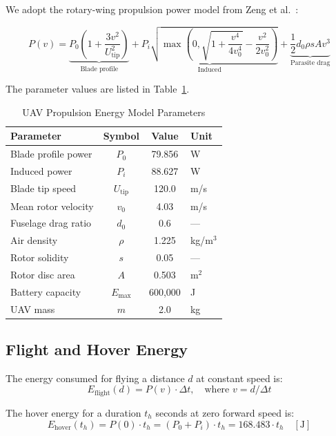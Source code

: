 \documentclass[12pt, a4paper, oneside]{report}
\begin{document}
We adopt the rotary-wing propulsion power model from Zeng et al.~\cite{zeng2019energy}:

\begin{equation}
P(v) = \underbrace{P_0\left(1 + \frac{3v^2}{U_{\text{tip}}^2}\right)}_{\text{Blade profile}} + \underbrace{P_i\sqrt{\max\left(0, \sqrt{1 + \frac{v^4}{4v_0^4}} - \frac{v^2}{2v_0^2}\right)}}_{\text{Induced}} + \underbrace{\frac{1}{2}d_0 \rho s A v^3}_{\text{Parasite drag}}
\label{eq:propulsion}
\end{equation}

The parameter values are listed in Table~\ref{tab:energy_params}.

\begin{table}[htbp]
\centering
\caption{UAV Propulsion Energy Model Parameters}
\label{tab:energy_params}
\begin{tabular}{lccl}
\toprule
\textbf{Parameter} & \textbf{Symbol} & \textbf{Value} & \textbf{Unit} \\
\midrule
Blade profile power & $P_0$ & 79.856 & W \\
Induced power & $P_i$ & 88.627 & W \\
Blade tip speed & $U_{\text{tip}}$ & 120.0 & m/s \\
Mean rotor velocity & $v_0$ & 4.03 & m/s \\
Fuselage drag ratio & $d_0$ & 0.6 & --- \\
Air density & $\rho$ & 1.225 & kg/m$^3$ \\
Rotor solidity & $s$ & 0.05 & --- \\
Rotor disc area & $A$ & 0.503 & m$^2$ \\
Battery capacity & $E_{\max}$ & 600,000 & J \\
UAV mass & $m$ & 2.0 & kg \\
\bottomrule
\end{tabular}
\end{table}

\subsection{Flight and Hover Energy}

The energy consumed for flying a distance $d$ at constant speed is:
\begin{equation}
E_{\text{flight}}(d) = P(v) \cdot \Delta t, \quad \text{where } v = d / \Delta t
\label{eq:flight_energy}
\end{equation}

The hover energy for a duration $t_h$ seconds at zero forward speed is:
\begin{equation}
E_{\text{hover}}(t_h) = P(0) \cdot t_h = (P_0 + P_i) \cdot t_h = 168.483 \cdot t_h \quad [\text{J}]
\label{eq:hover_energy}
\end{equation}
\end{document}
